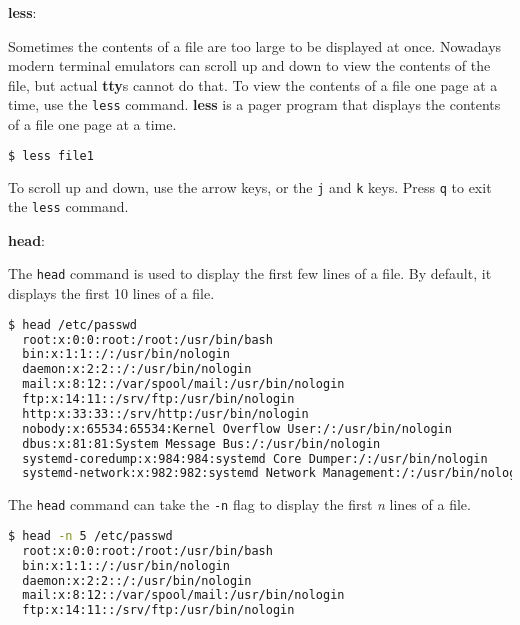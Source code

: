 \textbf{less}:

Sometimes the contents of a file are too large to be displayed at once.
Nowadays modern terminal emulators can scroll up and down to view the contents of the file,
but actual \textbf{tty}s cannot do that.
To view the contents of a file one page at a time, use the \texttt{less} command.
\textbf{less} is a pager program that displays the contents of a file one page at a time.

\begin{lstlisting}[language=bash]
  $ less file1
\end{lstlisting}

To scroll up and down, use the arrow keys, or the \texttt{j} and \texttt{k} keys.
Press \texttt{q} to exit the \texttt{less} command.

\textbf{head}:

The \texttt{head} command is used to display the first few lines of a file.
By default, it displays the first 10 lines of a file.

\begin{lstlisting}[language=bash]
  $ head /etc/passwd
  root:x:0:0:root:/root:/usr/bin/bash
  bin:x:1:1::/:/usr/bin/nologin
  daemon:x:2:2::/:/usr/bin/nologin
  mail:x:8:12::/var/spool/mail:/usr/bin/nologin
  ftp:x:14:11::/srv/ftp:/usr/bin/nologin
  http:x:33:33::/srv/http:/usr/bin/nologin
  nobody:x:65534:65534:Kernel Overflow User:/:/usr/bin/nologin
  dbus:x:81:81:System Message Bus:/:/usr/bin/nologin
  systemd-coredump:x:984:984:systemd Core Dumper:/:/usr/bin/nologin
  systemd-network:x:982:982:systemd Network Management:/:/usr/bin/nologin
\end{lstlisting}

The \texttt{head} command can take the \texttt{-n} flag to display the first \textit{n} lines of a file.

\begin{lstlisting}[language=bash]
  $ head -n 5 /etc/passwd
  root:x:0:0:root:/root:/usr/bin/bash
  bin:x:1:1::/:/usr/bin/nologin
  daemon:x:2:2::/:/usr/bin/nologin
  mail:x:8:12::/var/spool/mail:/usr/bin/nologin
  ftp:x:14:11::/srv/ftp:/usr/bin/nologin
\end{lstlisting}


